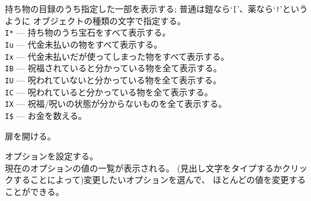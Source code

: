 \item[\tb{I}]
持ち物の目録のうち指定した一部を表示する; 普通は鎧なら`{\tt [}'、薬なら`{\tt !}'というように
オブジェクトの種類の文字で指定する。\\
{\tt I*} --- 持ち物のうち宝石をすべて表示する。\\
{\tt Iu} --- 代金未払いの物をすべて表示する。\\
{\tt Ix} --- 代金未払いだが使ってしまった物をすべて表示する。\\
{\tt IB} --- 祝福されていると分かっている物を全て表示する。\\
{\tt IU} --- 呪われていないと分かっている物を全て表示する。\\
{\tt IC} --- 呪われていると分かっている物を全て表示する。\\
{\tt IX} --- 祝福/呪いの状態が分からないものを全て表示する。\\
{\tt I\$} --- お金を数える。
\item[\tb{o}]
扉を開ける。
\item[\tb{O}]
オプションを設定する。\\
現在のオプションの値の一覧が表示される。
(見出し文字をタイプするかクリックすることによって)変更したいオプションを選んで、
ほとんどの値を変更することができる。
